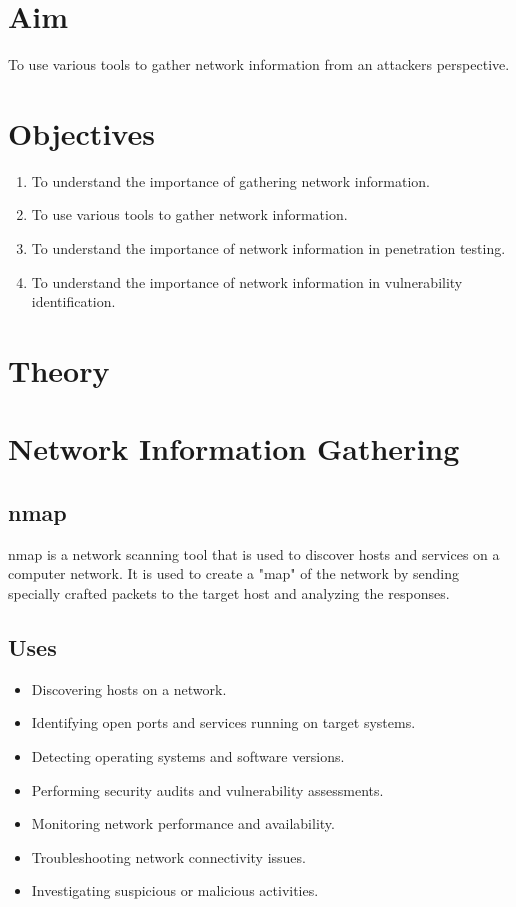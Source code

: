 \documentclass[11pt]{article}
\begin{document}
\tableofcontents
\thispagestyle{empty}
\clearpage

\setcounter{page}{1}

\section{Aim}
To use various tools to gather network information from an attackers perspective.

\section{Objectives}
\begin{enumerate}
    \item To understand the importance of gathering network information.
    \item To use various tools to gather network information.
    \item To understand the importance of network information in penetration testing.
    \item To understand the importance of network information in vulnerability identification.
\end{enumerate}
\section{Theory}
\section{Network Information Gathering}

\subsection{nmap}
nmap is a network scanning tool that is used to discover hosts and services on a computer network. It is used to create a "map" of the network by sending specially crafted packets to the target host and analyzing the responses.

\subsection{Uses}

\begin{itemize}
    \item Discovering hosts on a network.
    \item Identifying open ports and services running on target systems.
    \item Detecting operating systems and software versions.
    \item Performing security audits and vulnerability assessments.
    \item Monitoring network performance and availability.
    \item Troubleshooting network connectivity issues.
    \item Investigating suspicious or malicious activities.
\end{itemize}
\end{document}
